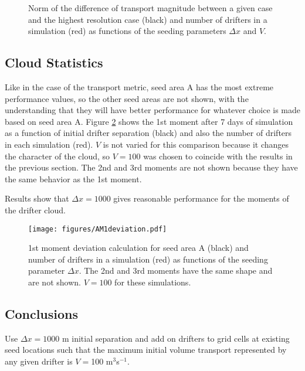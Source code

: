\documentclass[11pt]{article}
\begin{document}
\begin{figure}
	\centering
	\caption{Norm of the difference of transport magnitude between a given case and the highest resolution case (black) and number of drifters in a simulation (red) as functions of the seeding parameters $\Delta x$ and $V$.}
	\label{fig:transport}
\end{figure}

\subsection*{Cloud Statistics}

Like in the case of the transport metric, seed area A has the most extreme performance values, so the other seed areas are not shown, with the understanding that they will have better performance for whatever choice is made based on seed area A. Figure \ref{fig:AM1} shows the 1st moment after 7 days of simulation as a function of initial drifter separation (black) and also the number of drifters in each simulation (red). $V$ is not varied for this comparison because it changes the character of the cloud, so $V=100$ was chosen to coincide with the results in the previous section. The 2nd and 3rd moments are not shown because they have the same behavior as the 1st moment.

Results show that $\Delta x=1000$ gives reasonable performance for the moments of the drifter cloud.

\begin{figure}
	\centering
	\texttt{[image: figures/AM1deviation.pdf]}
	\caption{1st moment deviation calculation for seed area A (black) and number of drifters in a simulation (red) as functions of the seeding parameter $\Delta x$. The 2nd and 3rd moments have the same shape and are not shown. $V=100$ for these simulations.}
	\label{fig:AM1}
\end{figure}

\subsection*{Conclusions}

Use $\Delta x=1000$ m initial separation and add on drifters to grid cells at existing seed locations such that the maximum initial volume transport represented by any given drifter is $V=$100 m$^3$s$^{-1}$.
\end{document}
